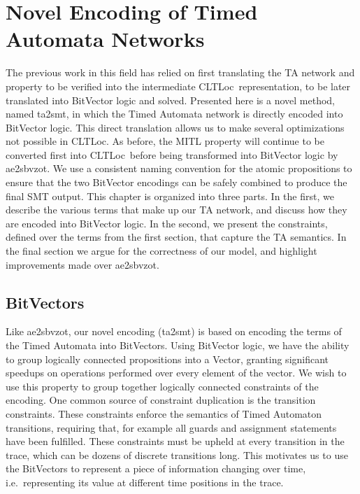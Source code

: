 \documentclass[a4paper,11pt]{report}
\theoremstyle{definition}
\newcommand{\cltloc}{CLTLoc}
\newcommand{\aez}{ae2sbvzot}
\begin{document}
\chapter{Novel Encoding of Timed Automata Networks}\label{encoding}

The previous work in this field has relied on first translating the TA network
and property to be verified into the intermediate \cltloc\ representation, to be
later translated into BitVector logic and solved. Presented here is a novel
method, named ta2smt, in which the Timed Automata network is directly encoded
into BitVector logic. This direct translation allows us to make several
optimizations not possible in \cltloc. As before, the MITL property will
continue to be converted first into \cltloc\ before being transformed into
BitVector logic by \aez. We use a consistent naming convention for the atomic
propositions to ensure that the two BitVector encodings can be safely combined
to produce the final SMT output. This chapter is organized into three parts. In
the first, we describe the various terms that make up our TA network, and
discuss how they are encoded into BitVector logic. In the second, we present the
constraints, defined over the terms from the first section, that capture the TA
semantics. In the final section we argue for the correctness of our model, and
highlight improvements made over \aez.

\section{BitVectors}


Like \aez, our novel encoding (ta2smt) is based on encoding the terms of the
Timed Automata into BitVectors. Using BitVector logic, we have the ability to
group logically connected propositions into a Vector, granting significant
speedups on operations performed over every element of the vector. We wish to
use this property to group together logically connected constraints of the
encoding. One common source of constraint duplication is the transition
constraints. These constraints enforce the semantics of Timed Automaton
transitions, requiring that, for example all guards and assignment statements
have been fulfilled. These constraints must be upheld at every transition in the
trace, which can be dozens of discrete transitions long. This motivates us to
use the BitVectors to represent a piece of information changing over time, i.e.\
representing its value at different time positions in the trace.
\end{document}
